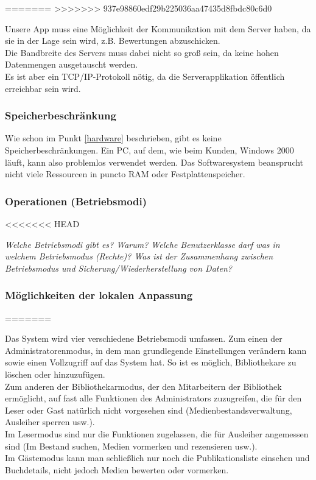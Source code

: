 \documentclass[fontsize=12pt,paper=a4,twoside]{scrartcl}
\begin{document}
=======
>>>>>>> 937e98860edf29b225036aa47435d8fbdc80c6d0

Unsere App muss eine Möglichkeit der Kommunikation mit dem Server haben, da sie in der Lage sein wird, z.B. Bewertungen abzuschicken. \\
Die Bandbreite des Servers muss dabei nicht so groß sein, da keine hohen Datenmengen ausgetauscht werden. \\ 
Es ist aber ein TCP/IP-Protokoll nötig, da die Serverapplikation öffentlich erreichbar sein wird.

\subsubsection{Speicherbeschränkung}
Wie schon im Punkt \ref{hardware} beschrieben, gibt es keine Speicherbeschränkungen. Ein PC, auf dem, 
wie beim Kunden, Windows 2000 läuft, kann also problemlos verwendet werden. Das Softwaresystem 
beansprucht nicht viele Ressourcen in puncto RAM oder Festplattenspeicher.

\subsubsection{Operationen (Betriebsmodi)}
<<<<<<< HEAD


  {\em Welche Betriebsmodi gibt es? Warum? Welche Benutzerklasse darf
  was in welchem Betriebsmodus (Rechte)? Was ist der Zusammenhang
  zwischen Betriebsmodus und Sicherung/Wiederherstellung von Daten?}

\subsubsection{Möglichkeiten der lokalen Anpassung}

=======
  
  Das System wird vier verschiedene Betriebsmodi umfassen. Zum einen der Administratorenmodus, in dem man grundlegende Einstellungen verändern kann sowie einen Vollzugriff auf das System hat. So ist es möglich, Bibliothekare zu löschen oder hinzuzufügen. \\
Zum anderen der Bibliothekarmodus, der den Mitarbeitern der Bibliothek ermöglicht, auf fast alle Funktionen des Administrators zuzugreifen, die für den Leser oder Gast natürlich nicht vorgesehen sind (Medienbestandsverwaltung, Ausleiher sperren usw.).\\
Im Lesermodus sind nur die Funktionen zugelassen, die für Ausleiher angemessen sind (Im Bestand suchen, Medien vormerken und rezensieren usw.). \\
Im Gästemodus kann man schließlich nur noch die Publikationsliste einsehen und Buchdetails, nicht jedoch Medien bewerten oder vormerken.
\end{document}
